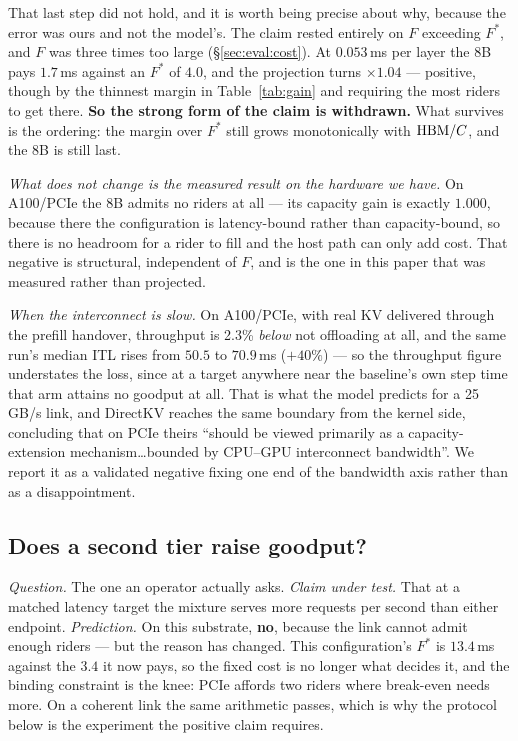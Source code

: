 That last step did not hold, and it is worth being precise about why, because the
error was ours and not the model's. The claim rested entirely on $F$ exceeding
$F^{*}$, and $F$ was three times too large (\S\ref{sec:eval:cost}). At
$0.053$\,ms per layer the 8B pays $1.7$\,ms against an $F^{*}$ of $4.0$, and the
projection turns $\times 1.04$ --- positive, though by the thinnest margin in
Table~\ref{tab:gain} and requiring the most riders to get there. \textbf{So the
strong form of the claim is withdrawn.} What survives is the ordering: the margin
over $F^{*}$ still grows monotonically with $\mathrm{HBM}/C$, and the 8B is still last.

\emph{What does not change is the measured result on the hardware we have.} On
A100/PCIe the 8B admits no riders at all --- its capacity gain is exactly $1.000$,
because there the configuration is latency-bound rather than capacity-bound, so
there is no headroom for a rider to fill and the host path can only add cost. That
negative is structural, independent of $F$, and is the one in this paper that was
measured rather than projected.

\emph{When the interconnect is slow.} On A100/PCIe, with real KV delivered through
the prefill handover, throughput is 2.3\% \emph{below} not offloading at all, and
the same run's median ITL rises from $50.5$ to $70.9$\,ms ($+40\%$) --- so the
throughput figure understates the loss, since at a target anywhere near the
baseline's own step time that arm attains no goodput at all.
That is what the model predicts for a 25\,GB/s link, and DirectKV reaches the same
boundary from the kernel side, concluding that on PCIe theirs ``should be viewed
primarily as a capacity-extension mechanism\ldots bounded by CPU--GPU interconnect
bandwidth''. We report it as a validated negative fixing one end of the bandwidth
axis rather than as a disappointment.

\subsection{Does a second tier raise goodput?}
\label{sec:eval:goodput}

\emph{Question.} The one an operator actually asks. \emph{Claim under test.} That at
a matched latency target the mixture serves more requests per second than either
endpoint. \emph{Prediction.} On this substrate, \textbf{no}, because the link cannot
admit enough riders --- but the reason has changed. This configuration's $F^{*}$ is
$13.4$\,ms against the $3.4$ it now pays, so the fixed cost is no longer what
decides it, and the binding constraint is the knee: PCIe affords two riders where
break-even needs more. On a coherent link the same arithmetic passes, which is why
the protocol below is the experiment the positive claim requires.

